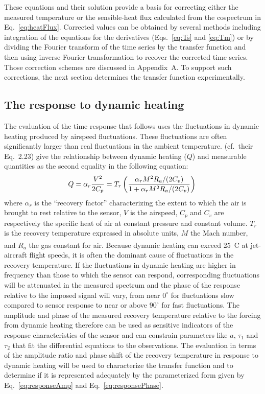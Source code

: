 \documentclass[amt, manuscript]{copernicus}
\begin{document}
These equations and their solution provide a basis for correcting either
the measured temperature or the sensible-heat flux calculated from the
cospectrum in Eq.~\eqref{eq:heatFlux}. Corrected values can be obtained
by several methods including integration of the equations for the
derivatives (Eqs.~\eqref{eq:Ts} and \eqref{eq:Tm}) or by dividing the
Fourier transform of the time series by the transfer function and then
using inverse Fourier transformation to recover the corrected time
series. Those correction schemes are discussed in Appendix~A. To support
such corrections, the next section determines the transfer function
experimentally.

\subsection{\texorpdfstring{The response to dynamic
heating\label{subsec:Dynamic-heating}}{The response to dynamic heating}}

The evaluation of the time response that follows uses the fluctuations
in dynamic heating produced by airspeed fluctuations. These fluctuations
are often significantly larger than real fluctuations in the ambient
temperature. \citet{BangeEtAl2013.ch2} (cf.~their Eq.~2.23) give the
relationship between dynamic heating (\(Q\)) and measurable quantities
as the second equality in the following equation: \begin{equation}
Q=\alpha_{r}\frac{V^{2}}{2C_{p}}=T_{r}\left(\frac{\alpha_{r}M^{2}R_{a}/(2C_{v})}{1+\alpha_{r}M^{2}R_{a}/(2C_{v})}\right){\label{eq:DHterm}}
\end{equation} where \(\alpha_{r}\) is the ``recovery factor''
characterizing the extent to which the air is brought to rest relative
to the sensor, \(V\) is the airspeed, \(C_{p}\) and \(C_{v}\) are
respectively the specific heat of air at constant pressure and constant
volume. \(T_{r}\) is the recovery temperature expressed in absolute
units, \(M\) the Mach number, and \(R_{a}\) the gas constant for air.
Because dynamic heating can exceed \unit{25^{\circ}C} at jet-aircraft
flight speeds, it is often the dominant cause of fluctuations in the
recovery temperature. If the fluctuations in dynamic heating are higher
in frequency than those to which the sensor can respond, corresponding
fluctuations will be attenuated in the measured spectrum and the phase
of the response relative to the imposed signal will vary, from near
\(0^{\circ}\) for fluctuations slow compared to sensor response to near
or above \(90^{\circ}\) for fast fluctuations. The amplitude and phase
of the measured recovery temperature relative to the forcing from
dynamic heating therefore can be used as sensitive indicators of the
response characteristics of the sensor and can constrain parameters like
\(a\), \(\tau_{1}\) and \(\tau_{2}\) that fit the differential equations
to the observations. The evaluation in terms of the amplitude ratio and
phase shift of the recovery temperature in response to dynamic heating
will be used to characterize the transfer function and to determine if
it is represented adequately by the parameterized form given by
Eq.~\eqref{eq:responseAmp} and Eq.~\eqref{eq:responsePhase}.
\end{document}
